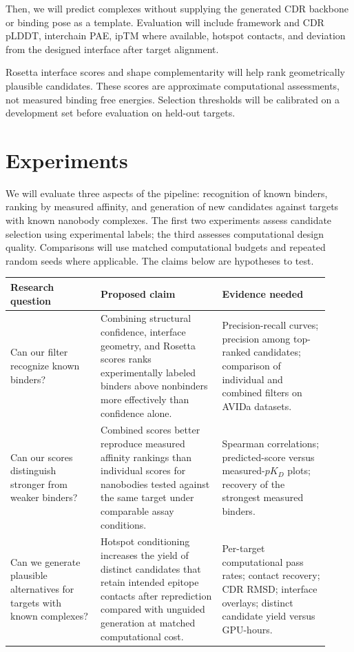 \documentclass[11pt, logo, nonumbering]{preprint}
\begin{document}
Then, we will predict complexes without supplying the generated CDR backbone or binding pose as a template. Evaluation will include framework and CDR pLDDT, interchain PAE, ipTM where available, hotspot contacts, and deviation from the designed interface after target alignment.


Rosetta interface scores and shape complementarity will help rank geometrically plausible candidates. These scores are approximate computational assessments, not measured binding free energies. Selection thresholds will be calibrated on a development set before evaluation on held-out targets.

\section{Experiments}
\label{sec:experiment}
We will evaluate three aspects of the pipeline: recognition of known binders,
ranking by measured affinity, and generation of new candidates against targets
with known nanobody complexes. The first two experiments assess candidate
selection using experimental labels; the third assesses computational design
quality. Comparisons will use matched computational budgets and repeated random
seeds where applicable. The claims below are hypotheses to test.

\begin{center}
\small
\begin{tabular}{@{}>{\raggedright\arraybackslash}p{0.26\linewidth} >{\raggedright\arraybackslash}p{0.35\linewidth} >{\raggedright\arraybackslash}p{0.31\linewidth}@{}}
\toprule
\textbf{Research question} & \textbf{Proposed claim} & \textbf{Evidence needed} \\
\midrule
Can our filter recognize known binders?
& Combining structural confidence, interface geometry, and Rosetta scores
ranks experimentally labeled binders above nonbinders more effectively than
confidence alone.
& Precision-recall curves; precision among top-ranked candidates; comparison
of individual and combined filters on AVIDa datasets. \\
\addlinespace
Can our scores distinguish stronger from weaker binders?
& Combined scores better reproduce measured affinity rankings than individual
scores for nanobodies tested against the same target under comparable
assay conditions.
& Spearman correlations; predicted-score versus measured-$pK_D$ plots;
recovery of the strongest measured binders. \\
\addlinespace
Can we generate plausible alternatives for targets with known complexes?
& Hotspot conditioning increases the yield of distinct candidates that retain
intended epitope contacts after reprediction compared with unguided generation
at matched computational cost.
& Per-target computational pass rates; contact recovery; CDR RMSD;
interface overlays; distinct candidate yield versus GPU-hours. \\
\bottomrule
\end{tabular}
\end{center}
\end{document}
